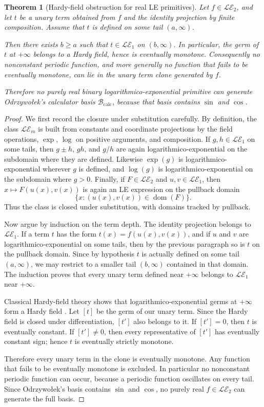 \documentclass[12pt]{amsart}
\newtheorem{theorem}{Theorem}
\theoremstyle{remark}
\newcommand{\LE}{\mathcal{LE}}
\begin{document}
\begin{theorem}[Hardy-field obstruction for real LE primitives]\label{thm:hardy}
Let $f\in \LE_2$, and let $t$ be a unary term obtained from $f$ and the identity projection by finite composition.  Assume that $t$ is defined on some tail $(a,\infty)$.

Then there exists $b\geq a$ such that $t\in \LE_1$ on $(b,\infty)$.  In particular, the germ of $t$ at $+\infty$ belongs to a Hardy field, hence is eventually monotone.  Consequently no nonconstant periodic function, and more generally no function that fails to be eventually monotone, can lie in the unary term clone generated by $f$.

Therefore no purely real binary logarithmico-exponential primitive can generate Odrzywo\l{}ek's calculator basis $\mathcal{B}_{\mathrm{calc}}$, because that basis contains $\sin$ and $\cos$.
\end{theorem}

\begin{proof}
We first record the closure under substitution carefully.  By definition, the class $\LE_m$ is built from constants and coordinate projections by the field operations, $\exp$, $\log$ on positive arguments, and composition.  If $g,h\in \LE_1$ on some tails, then $g\pm h$, $gh$, and $g/h$ are again logarithmico-exponential on the subdomain where they are defined.  Likewise $\exp(g)$ is logarithmico-exponential wherever $g$ is defined, and $\log(g)$ is logarithmico-exponential on the subdomain where $g>0$.  Finally, if $F\in \LE_2$ and $u,v\in \LE_1$, then $x\mapsto F(u(x),v(x))$ is again an LE expression on the pullback domain
\[
\{x:(u(x),v(x))\in \operatorname{dom}(F)\}.
\]
Thus the class is closed under substitution, with domains tracked by pullback.

Now argue by induction on the term depth.  The identity projection belongs to $\LE_1$.  If a term $t$ has the form $t(x)=f(u(x),v(x))$, and if $u$ and $v$ are logarithmico-exponential on some tails, then by the previous paragraph so is $t$ on the pullback domain.  Since by hypothesis $t$ is actually defined on some tail $(a,\infty)$, we may restrict to a smaller tail $(b,\infty)$ contained in that domain.  The induction proves that every unary term defined near $+\infty$ belongs to $\LE_1$ near $+\infty$.

Classical Hardy-field theory shows that logarithmico-exponential germs at $+\infty$ form a Hardy field \cite{Hardy1910,Rosenlicht1983,AschenbrennerVanDenDriesVanDerHoeven2017}.  Let $[t]$ be the germ of our unary term.  Since the Hardy field is closed under differentiation, $[t']$ also belongs to it.  If $[t']=0$, then $t$ is eventually constant.  If $[t']\neq 0$, then every representative of $[t']$ has eventually constant sign; hence $t$ is eventually strictly monotone.

Therefore every unary term in the clone is eventually monotone.  Any function that fails to be eventually monotone is excluded.  In particular no nonconstant periodic function can occur, because a periodic function oscillates on every tail.  Since Odrzywo\l{}ek's basis contains $\sin$ and $\cos$, no purely real $f\in \LE_2$ can generate the full basis.\qedhere
\end{proof}
\end{document}
